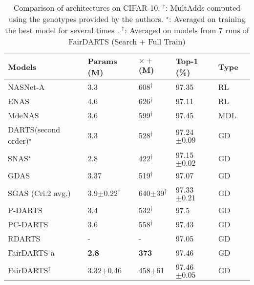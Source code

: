 \documentclass[runningheads]{llncs}
\begin{document}
\setlength{\tabcolsep}{4pt}
\begin{table}
	\begin{center}
		\caption{Comparison of architectures on CIFAR-10. $^\dagger$: MultAdds computed using the genotypes provided by the authors. $^\star$: Averaged on training the best model for several times .   $^\ddagger$: Averaged on models from 7 runs of FairDARTS (Search + Full Train)} 
		\label{tab:comparison-cifar10}
	  \begin{footnotesize}
		\begin{tabular}{*{6}{l}} 			
		\hline\noalign{\smallskip}
			Models  & Params (M) & $\times+$ (M) & Top-1 (\%) & Type  \\
\hline\noalign{\smallskip}
			NASNet-A \cite{zoph2017learning}  & 3.3 & 608$^\dagger$  &  97.35 & RL \\
			ENAS \cite{pham2018efficient} & 4.6 & 626$^\dagger$ & 97.11 & RL     \\	
			MdeNAS\cite{zheng2019multinomial} & 3.6 & 599$^\dagger$ & 97.45 & MDL \\
			\hline\noalign{\smallskip}
			DARTS(second order)$^\star$\cite{liu2018darts} & 3.3 & 528$^\dagger$ & 97.24$\pm0.09$ & GD \\ 
SNAS$^\star$ \cite{xie2018snas}  & 2.8 & 422$^\dagger$ & 97.15$\pm0.02$ & GD\\
			GDAS \cite{dong2019searching} & 3.37 & 519$^\dagger$ & 97.07 &GD \\
			SGAS (Cri.2 avg.) \cite{li2019sgas} & 3.9$\pm$0.22$^\dagger$ & 640$\pm$39$^\dagger$ & 97.33$\pm0.21$ & GD\\
			P-DARTS \cite{chen2019progressive} & 3.4 & 532$^\dagger$ & 97.5 & GD \\ 
			PC-DARTS \cite{xu2019pc} & 3.6 & 558$^\dagger$ & 97.43 & GD \\ 
			RDARTS \cite{zela2020understanding} &-& -& 97.05 & GD \\
			FairDARTS-a & \textbf{2.8} & \textbf{373} & 97.46 & GD \\ 
			FairDARTS$^\ddagger$ & 3.32$\pm$0.46  & 458$\pm$61 & 97.46$\pm0.05$ & GD \\
\hline
		\end{tabular}
		\end{footnotesize}
	\end{center}
\end{table}\setlength{\tabcolsep}{1.4pt}
\end{document}
